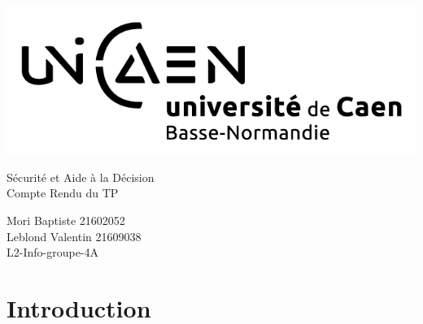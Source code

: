 \documentclass[a4paper,12pt]{article} %
\begin{document}




\begin{titlepage}

\includegraphics[scale=0.3]{images/unicaen.png}

\vspace{7cm}

\begin{center}

\begin{Huge}
Sécurité et Aide à la Décision\\
Compte Rendu du TP\\
\end{Huge}
\vspace{2cm}
\begin{large}
Mori Baptiste 21602052\\
Leblond Valentin 21609038\\
\vspace{1cm}
L2-Info-groupe-4A
\end{large}

\end{center}
\end{titlepage}



\newpage

\tableofcontents{}

\newpage



\section*{Introduction}
\end{document}
